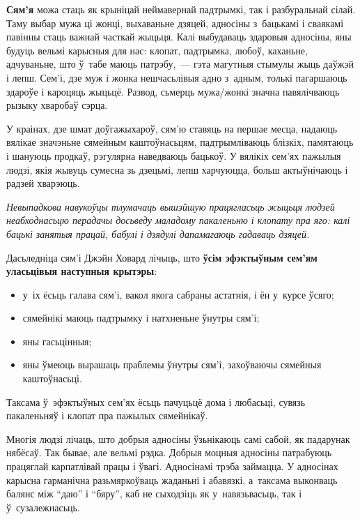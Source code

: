\textbf{Сям'я} можа стаць як крыніцай неймавернай падтрымкі, так і разбуральнай сілай. Таму выбар мужа ці жонці, выхаваньне дзяцей, адносіны з~бацькамі і сваякамі павінны стаць важнай часткай жыцьця. Калі выбудаваць здаровыя адносіны, яны будуць вельмі карысныя для нас: клопат, падтрымка, любоў, каханьне, адчуваньне, што ў~табе маюць патрэбу,~--- гэта магутныя стымулы жыць даўжэй і лепш. Сем'і, дзе муж і жонка нешчасьлівыя адно з~адным, толькі пагаршаюць здароўе і кароцяць жыцьцё. Развод, сьмерць мужа/жонкі значна павялічваюць рызыку хваробаў сэрца. 


У краінах, дзе шмат доўгажыхароў, сям'ю ставяць на першае месца, надаюць вялікае значэньне сямейным каштоўнасьцям, падтрымліваюць блізкіх, памятаюць і шануюць продкаў, рэгулярна наведваюць бацькоў. У вялікіх сем'ях пажылыя людзі, якія жывуць сумесна зь дзецьмі, лепш харчуюцца, больш актыўнічаюць і радзей хварэюць.

\emph{Невыпадкова навукоўцы тлумачаць вышэйшую працягласьць жыцьця людзей неабходнасьцю перадачы досьведу маладому пакаленьню і клопату пра яго: калі бацькі занятыя працай, бабулі і дзядулі дапамагаюць гадаваць дзяцей.}

Дасьледніца сям'і Джэйн Ховард лічыць, што \textbf{ўсім эфэктыўным сем'ям уласьцівыя наступныя крытэры}: 
\begin{itemize}
  \item у~іх ёсьць галава сям'і, вакол якога сабраны астатнія, і ён у~курсе ўсяго;
  \item сямейнікі маюць падтрымку і натхненьне ўнутры сям'і;
  \item яны гасьцінныя;
  \item яны ўмеюць вырашаць праблемы ўнутры сям'і, захоўваючы сямейныя каштоўнасьці.
\end{itemize}

Таксама ў~эфэктыўных сем'ях ёсьць пачуцьцё дома і любасьці, сувязь пакаленьняў і клопат пра пажылых сямейнікаў.

Многія людзі лічаць, што добрыя адносіны ўзьнікаюць самі сабой, як падарунак нябёсаў. Так бывае, але вельмі рэдка. Добрыя моцныя адносіны патрабуюць працяглай карпатлівай працы і ўвагі. Адносінамі трэба займацца. У адносінах карысна гарманічна разьмяркоўваць жаданьні і абавязкі, а~таксама выконваць балянс між ``даю'' і ``бяру'', каб не сыходзіць як у~навязьвасьць, так і ў~сузалежнасьць.

